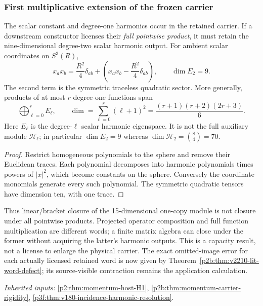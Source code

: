 \documentclass[12pt,a4paper]{article}
\begin{document}
\subsubsection{First multiplicative extension of the frozen carrier}
\label{p2b:sec:v2201-derived-d01}

\begin{proposition}
\label{p2b:prop:derived-d01-pointwise-extension}
The scalar constant and degree-one harmonics occur in the retained carrier.
If a downstream constructor licenses their \emph{full pointwise product},
it must retain the nine-dimensional degree-two scalar harmonic output.
For ambient scalar coordinates on $S^3(R)$,
\[
 x_ax_b=\frac{R^2}{4}\delta_{ab}
 +\left(x_ax_b-\frac{R^2}{4}\delta_{ab}\right),\qquad
 \dim E_2=9.
\]
The second term is the symmetric traceless quadratic sector. More generally,
products of at most $r$ degree-one functions span
\[
 \bigoplus_{\ell=0}^r E_\ell,
 \qquad \dim=\sum_{\ell=0}^r(\ell+1)^2
 =\frac{(r+1)(r+2)(2r+3)}6.
\]
Here $E_\ell$ is the degree-$\ell$ scalar harmonic eigenspace.
It is not the full auxiliary module $\mathcal H_\ell$; in particular
$\dim E_2=9$ whereas $\dim\mathcal H_2=\binom84=70$.
\end{proposition}
\begin{proof}
Restrict homogeneous polynomials to the sphere and remove their
Euclidean traces. Each polynomial decomposes into harmonic polynomials times
powers of $|x|^2$, which become constants on the sphere. Conversely the
coordinate monomials generate every such polynomial. The symmetric
quadratic tensors have dimension ten, with one trace.
\end{proof}
Thus linear/bracket closure of the 15-dimensional one-copy module is not closure
under all pointwise products. Projected operator composition and full
function multiplication are different words; a finite matrix algebra can
close under the former without acquiring the latter's harmonic outputs.
This is a capacity result, not a license to enlarge the physical carrier. The exact omitted-image error for each actually licensed retained word is now given by Theorem~\ref{p2b:thm:v2210-lit-word-defect}; its source-visible contraction remains the application calculation.
\par\noindent\textit{Inherited inputs:} \ref{p2:thm:momentum-host-H1}, \ref{p2b:thm:momentum-carrier-rigidity}, \ref{p3f:thm:v180-incidence-harmonic-resolution}.
\end{document}
